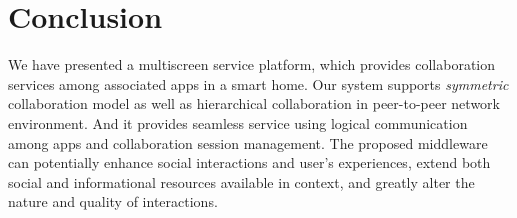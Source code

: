 \documentclass[conference]{IEEEtran}
\begin{document}
%
%
%
%

\section{Conclusion}
\label{sc:Conclusion}

We have presented a multiscreen service platform, which provides collaboration services among associated apps in a smart home. 
Our system supports \textit{symmetric} collaboration model as well as hierarchical collaboration in peer-to-peer network environment.
And it provides seamless service using logical communication among apps and collaboration session management.
The proposed middleware can potentially enhance social interactions and user's experiences, extend both social and informational resources available in context, and greatly alter the nature and quality of interactions.
\end{document}
